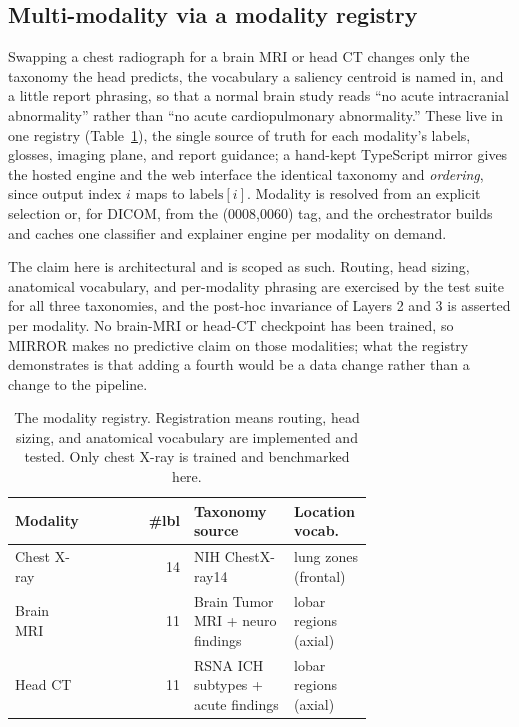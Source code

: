 \documentclass[10pt,twocolumn]{article}
\begin{document}
\subsection{Multi-modality via a modality registry}
Swapping a chest radiograph for a brain MRI or head CT changes only the taxonomy
the head predicts, the vocabulary a saliency centroid is named in, and a little
report phrasing, so that a normal brain study reads ``no acute intracranial
abnormality'' rather than ``no acute cardiopulmonary abnormality.'' These live in
one registry (Table~\ref{tab:modalities}), the single source of truth for each
modality's labels, glosses, imaging plane, and report guidance; a hand-kept
TypeScript mirror gives the hosted engine and the web interface the identical
taxonomy and \emph{ordering}, since output index $i$ maps to
$\text{labels}[i]$. Modality is resolved from an explicit selection or, for DICOM,
from the (0008,0060) tag, and the orchestrator builds and caches one classifier
and explainer engine per modality on demand.

The claim here is architectural and is scoped as such. Routing, head sizing,
anatomical vocabulary, and per-modality phrasing are exercised by the test suite
for all three taxonomies, and the post-hoc invariance of Layers 2 and 3 is
asserted per modality. No brain-MRI or head-CT checkpoint has been trained, so
MIRROR makes no predictive claim on those modalities; what the registry
demonstrates is that adding a fourth would be a data change rather than a change
to the pipeline.

\begin{table}[tbp]
\centering
\caption{The modality registry. Registration means routing, head sizing, and
anatomical vocabulary are implemented and tested. Only chest X-ray is trained and
benchmarked here.}
\label{tab:modalities}
\footnotesize
\begin{tabular}{@{}p{0.20\linewidth}r%
>{\raggedright\arraybackslash}p{0.29\linewidth}%
>{\raggedright\arraybackslash}p{0.22\linewidth}@{}}
\toprule
\textbf{Modality} & \textbf{\#lbl} & \textbf{Taxonomy source} & \textbf{Location vocab.} \\
\midrule
Chest X-ray & 14 & NIH ChestX-ray14 & lung zones (frontal) \\
Brain MRI   & 11 & Brain Tumor MRI + neuro findings & lobar regions (axial) \\
Head CT     & 11 & RSNA ICH subtypes + acute findings & lobar regions (axial) \\
\bottomrule
\end{tabular}
\end{table}
\end{document}
